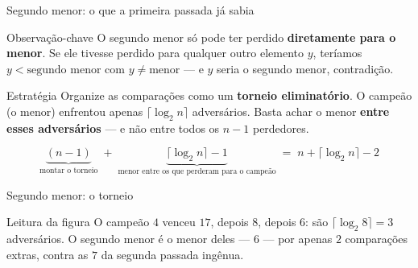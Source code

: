 \documentclass[aspectratio=169]{beamer}
\begin{document}
\begin{frame}[shrink=20]{Segundo menor: o que a primeira passada já sabia}
  \begin{block}{Observação-chave}
    O segundo menor só pode ter perdido \textbf{diretamente para o menor}.
    Se ele tivesse perdido para qualquer outro elemento $y$, teríamos
    $y < \text{segundo menor}$ com $y \ne \text{menor}$ --- e $y$ seria o
    segundo menor, contradição.
  \end{block}

  \begin{block}{Estratégia}
    Organize as comparações como um \textbf{torneio eliminatório}. O campeão
    (o menor) enfrentou apenas $\lceil \log_2 n \rceil$ adversários. Basta
    achar o menor \textbf{entre esses adversários} --- e não entre todos os
    $n-1$ perdedores.
  \end{block}

  \[
    \underbrace{(n-1)}_{\text{montar o torneio}} \;+\;
    \underbrace{\lceil \log_2 n \rceil - 1}_{\text{menor entre os que perderam para o campeão}}
    \;=\; n + \lceil \log_2 n \rceil - 2
  \]
\end{frame}

\begin{frame}[shrink=20]{Segundo menor: o torneio}
  \begin{center}
  \end{center}

  \begin{block}{Leitura da figura}
    O campeão $4$ venceu $17$, depois $8$, depois $6$: são
    $\lceil \log_2 8 \rceil = 3$ adversários. O segundo menor é o menor deles
    --- $6$ --- por apenas $2$ comparações extras, contra as $7$ da segunda
    passada ingênua.
  \end{block}
\end{frame}
\end{document}
